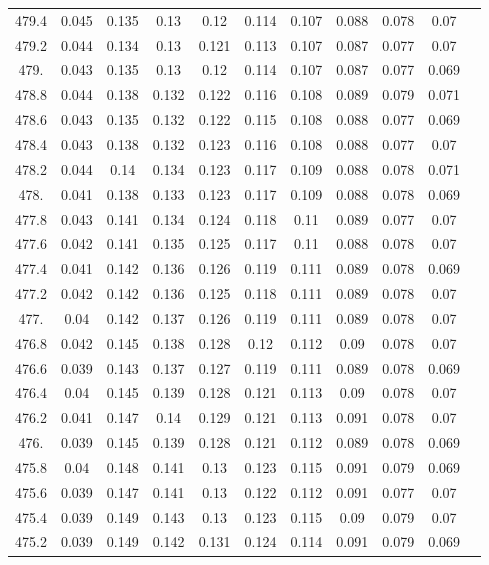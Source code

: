 \documentclass[12pt]{ctexart}
\numberwithin{equation}{section}
\begin{document}
\begin{longtable}{ccccccccccc}
479.4	&	0.045	&	0.135	&	0.13	&	0.12	&	0.114	&	0.107	&	0.088	&	0.078	&	0.07	\\
479.2	&	0.044	&	0.134	&	0.13	&	0.121	&	0.113	&	0.107	&	0.087	&	0.077	&	0.07	\\
479.	&	0.043	&	0.135	&	0.13	&	0.12	&	0.114	&	0.107	&	0.087	&	0.077	&	0.069	\\
478.8	&	0.044	&	0.138	&	0.132	&	0.122	&	0.116	&	0.108	&	0.089	&	0.079	&	0.071	\\
478.6	&	0.043	&	0.135	&	0.132	&	0.122	&	0.115	&	0.108	&	0.088	&	0.077	&	0.069	\\
478.4	&	0.043	&	0.138	&	0.132	&	0.123	&	0.116	&	0.108	&	0.088	&	0.077	&	0.07	\\
478.2	&	0.044	&	0.14	&	0.134	&	0.123	&	0.117	&	0.109	&	0.088	&	0.078	&	0.071	\\
478.	&	0.041	&	0.138	&	0.133	&	0.123	&	0.117	&	0.109	&	0.088	&	0.078	&	0.069	\\
477.8	&	0.043	&	0.141	&	0.134	&	0.124	&	0.118	&	0.11	&	0.089	&	0.077	&	0.07	\\
477.6	&	0.042	&	0.141	&	0.135	&	0.125	&	0.117	&	0.11	&	0.088	&	0.078	&	0.07	\\
477.4	&	0.041	&	0.142	&	0.136	&	0.126	&	0.119	&	0.111	&	0.089	&	0.078	&	0.069	\\
477.2	&	0.042	&	0.142	&	0.136	&	0.125	&	0.118	&	0.111	&	0.089	&	0.078	&	0.07	\\
477.	&	0.04	&	0.142	&	0.137	&	0.126	&	0.119	&	0.111	&	0.089	&	0.078	&	0.07	\\
476.8	&	0.042	&	0.145	&	0.138	&	0.128	&	0.12	&	0.112	&	0.09	&	0.078	&	0.07	\\
476.6	&	0.039	&	0.143	&	0.137	&	0.127	&	0.119	&	0.111	&	0.089	&	0.078	&	0.069	\\
476.4	&	0.04	&	0.145	&	0.139	&	0.128	&	0.121	&	0.113	&	0.09	&	0.078	&	0.07	\\
476.2	&	0.041	&	0.147	&	0.14	&	0.129	&	0.121	&	0.113	&	0.091	&	0.078	&	0.07	\\
476.	&	0.039	&	0.145	&	0.139	&	0.128	&	0.121	&	0.112	&	0.089	&	0.078	&	0.069	\\
475.8	&	0.04	&	0.148	&	0.141	&	0.13	&	0.123	&	0.115	&	0.091	&	0.079	&	0.069	\\
475.6	&	0.039	&	0.147	&	0.141	&	0.13	&	0.122	&	0.112	&	0.091	&	0.077	&	0.07	\\
475.4	&	0.039	&	0.149	&	0.143	&	0.13	&	0.123	&	0.115	&	0.09	&	0.079	&	0.07	\\
475.2	&	0.039	&	0.149	&	0.142	&	0.131	&	0.124	&	0.114	&	0.091	&	0.079	&	0.069	\\

\end{longtable}
\end{document}
